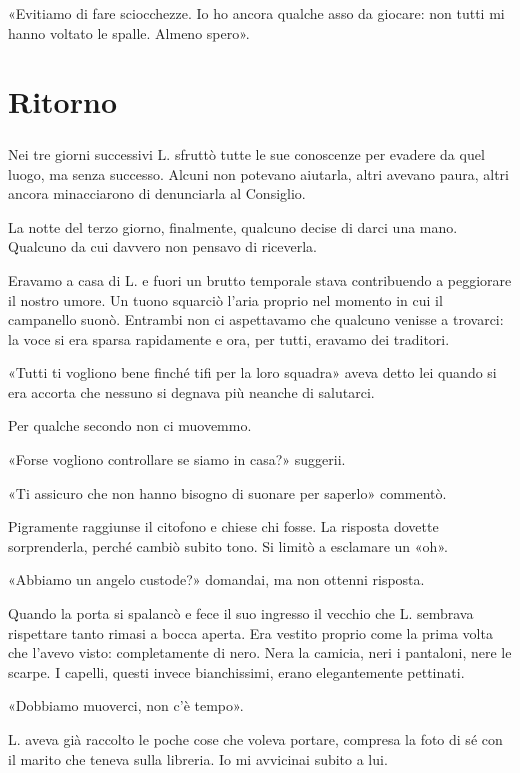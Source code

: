 \documentclass[a4paper,12pt]{book}
\begin{document}
«Evitiamo di fare sciocchezze. Io ho ancora qualche asso da giocare: non tutti
mi hanno voltato le spalle. Almeno spero».

\chapter{Ritorno}

\paragraph{}
Nei tre giorni successivi L. sfruttò tutte le sue conoscenze per evadere da quel
luogo, ma senza successo. Alcuni non potevano aiutarla, altri avevano paura,
altri ancora minacciarono di denunciarla al Consiglio.

La notte del terzo giorno, finalmente, qualcuno decise di darci una mano.
Qualcuno da cui davvero non pensavo di riceverla.

Eravamo a casa di L. e fuori un brutto temporale stava contribuendo a peggiorare
il nostro umore. Un tuono squarciò l'aria proprio nel momento in cui il
campanello suonò. Entrambi non ci aspettavamo che qualcuno venisse a trovarci:
la voce si era sparsa rapidamente e ora, per tutti, eravamo dei traditori.

«Tutti ti vogliono bene finché tifi per la loro squadra» aveva detto lei quando
si era accorta che nessuno si degnava più neanche di salutarci.

Per qualche secondo non ci muovemmo.

«Forse vogliono controllare se siamo in casa?» suggerii.

«Ti assicuro che non hanno bisogno di suonare per saperlo» commentò.

Pigramente raggiunse il citofono e chiese chi fosse. La risposta dovette
sorprenderla, perché cambiò subito tono. Si limitò a esclamare un «oh».

«Abbiamo un angelo custode?» domandai, ma non ottenni risposta.

Quando la porta si spalancò e fece il suo ingresso il vecchio che L. sembrava
rispettare tanto rimasi a bocca aperta. Era vestito proprio come la prima volta
che l'avevo visto: completamente di nero. Nera la camicia, neri i pantaloni,
nere le scarpe. I capelli, questi invece bianchissimi, erano elegantemente
pettinati.

«Dobbiamo muoverci, non c'è tempo».

L. aveva già raccolto le poche cose che voleva portare, compresa la foto di sé
con il marito che teneva sulla libreria. Io mi avvicinai subito a lui.
\end{document}
